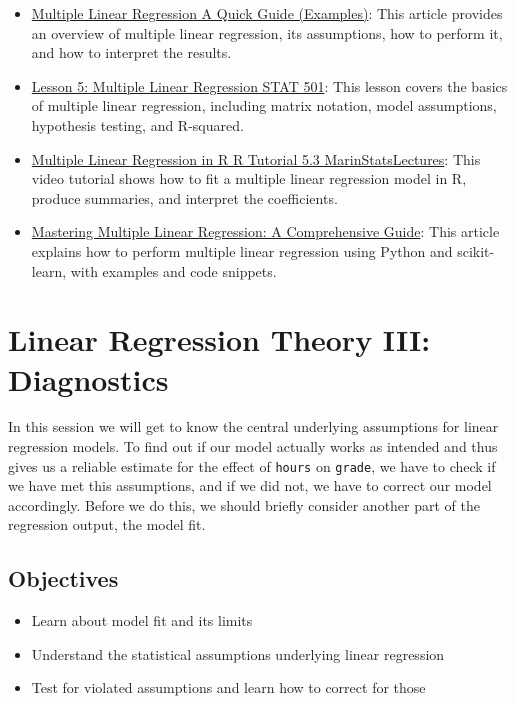 \documentclass[
]{book}
\providecommand{\tightlist}{%
  \setlength{\itemsep}{0pt}\setlength{\parskip}{0pt}}
\begin{document}
\begin{itemize}
\tightlist
\item
  \href{https://www.scribbr.com/statistics/multiple-linear-regression/}{Multiple Linear Regression \textbar{} A Quick Guide (Examples)}: This article provides an overview of multiple linear regression, its assumptions, how to perform it, and how to interpret the results.
\item
  \href{https://online.stat.psu.edu/stat501/lesson/5}{Lesson 5: Multiple Linear Regression \textbar{} STAT 501}: This lesson covers the basics of multiple linear regression, including matrix notation, model assumptions, hypothesis testing, and R-squared.
\item
  \href{https://www.youtube.com/watch?v=q1RD5ECsSB0}{Multiple Linear Regression in R \textbar{} R Tutorial 5.3 \textbar{} MarinStatsLectures}: This video tutorial shows how to fit a multiple linear regression model in R, produce summaries, and interpret the coefficients.
\item
  \href{https://www.analyticsvidhya.com/blog/2021/05/multiple-linear-regression-using-python-and-scikit-learn/}{Mastering Multiple Linear Regression: A Comprehensive Guide}: This article explains how to perform multiple linear regression using Python and scikit-learn, with examples and code snippets.
\end{itemize}

\hypertarget{log-t-3}{%
\chapter{Linear Regression Theory III: Diagnostics}\label{log-t-3}}

In this session we will get to know the central underlying assumptions for linear
regression models. To find out if our model actually works as intended and thus
gives us a reliable estimate for the effect of \texttt{hours} on \texttt{grade}, we have to
check if we have met this assumptions, and if we did not, we have to correct our
model accordingly. Before we do this, we should briefly consider another part
of the regression output, the model fit.

\hypertarget{objectives-5}{%
\section{Objectives}\label{objectives-5}}

\begin{itemize}
\tightlist
\item
  Learn about model fit and its limits
\item
  Understand the statistical assumptions underlying linear regression
\item
  Test for violated assumptions and learn how to correct for those
\end{itemize}
\end{document}
